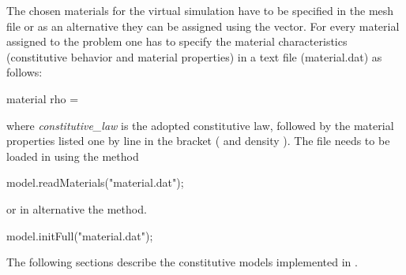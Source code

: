 The chosen materials for the virtual simulation have to be specified
in the mesh file or as an alternative they can be assigned using the
 vector.  For every material assigned to the
problem one has to specify the material characteristics (constitutive
behavior and material properties) in a text file (\eg material.dat) as
follows:
\begin{cpp} material %
rho = %
\end{cpp}  where \emph{constitutive\_law} is
the adopted constitutive law, followed by the material properties
listed one by line in the bracket (\eg {} and density
). The file needs to be loaded in \akantu using the
 method
\begin{cpp} model.readMaterials("material.dat");
\end{cpp} or in alternative the  method.
\begin{cpp} model.initFull("material.dat");
\end{cpp} The following sections describe the constitutive models
implemented in \akantu.

